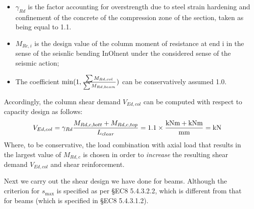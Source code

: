 \begin{itemize}
\item $\gamma_{Rd}$ is the factor accounting for overstrength due to steel
  strain hardening and confinement of the concrete of the compression zone of
  the section, taken as being equal to 1.1.
\item $M_{Rc,i}$ is the design value of the column moment of resistance at end i
  in the sense of the seisnlic bending InOlnent under the considered sense of
  the seismic action;
\item The coefficient $\min (1,\frac{\sum M_{Rd,col}}{\sum M_{Rd,beam}})$ can be conservatively assumed 1.0.
\end{itemize}

Accordingly, the column shear demand $V_{Ed,col}$ can be computed with respect
to capacity design as follows:
\begin{align*}
  V_{Ed,col} = \gamma_{Rd} \frac{M_{Rd,c,bott} + M_{Rd,c,top}}{L_{clear}}
  &= 1.1 \times \frac{\g{MRdc} \mbox{kNm} +\g{MRdc} \mbox{kNm}}{\g{Lclr} \mbox{mm}} = \g{VEdcol} \mbox{kN}\\
\end{align*}
Where, to be conservative, the load combination with axial load that results in
the largest value of $M_{Rd,c}$ is chosen in order to \emph{increase} the
resulting shear demand $V_{Ed,col}$ and shear reinforcement.

Next we carry out the shear design we have done for beams. Although the
criterion for $s_{\max}$ is specified as per \S EC8 5.4.3.2.2, which is
different from that for beams (which is specified in \S EC8 5.4.3.1.2).

